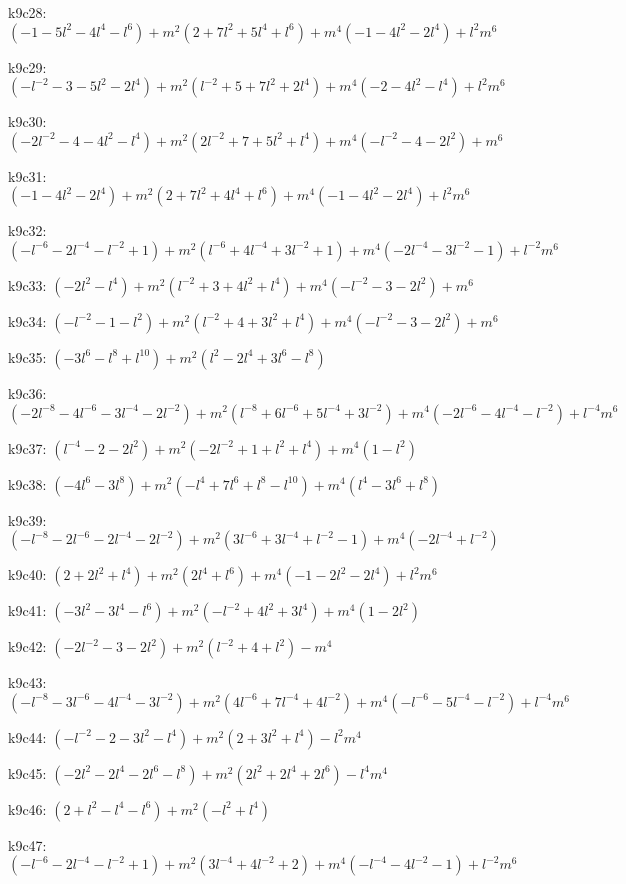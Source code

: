 k9c28: $ (-1-5l^{2}-4l^{4}-l^{6})  +m^{2}(2+7l^{2}+5l^{4}+l^{6})  +m^{4}(-1-4l^{2}-2l^{4})  +l^{2}m^{6} $ 

k9c29: $ (-l^{-2}-3-5l^{2}-2l^{4})  +m^{2}(l^{-2}+5+7l^{2}+2l^{4})  +m^{4}(-2-4l^{2}-l^{4})  +l^{2}m^{6} $ 

k9c30: $ (-2l^{-2}-4-4l^{2}-l^{4})  +m^{2}(2l^{-2}+7+5l^{2}+l^{4})  +m^{4}(-l^{-2}-4-2l^{2})  +m^{6} $ 

k9c31: $ (-1-4l^{2}-2l^{4})  +m^{2}(2+7l^{2}+4l^{4}+l^{6})  +m^{4}(-1-4l^{2}-2l^{4})  +l^{2}m^{6} $ 

k9c32: $ (-l^{-6}-2l^{-4}-l^{-2}+1)  +m^{2}(l^{-6}+4l^{-4}+3l^{-2}+1)  +m^{4}(-2l^{-4}-3l^{-2}-1)  +l^{-2}m^{6} $ 

k9c33: $ (-2l^{2}-l^{4})  +m^{2}(l^{-2}+3+4l^{2}+l^{4})  +m^{4}(-l^{-2}-3-2l^{2})  +m^{6} $ 

k9c34: $ (-l^{-2}-1-l^{2})  +m^{2}(l^{-2}+4+3l^{2}+l^{4})  +m^{4}(-l^{-2}-3-2l^{2})  +m^{6} $ 

k9c35: $ (-3l^{6}-l^{8}+l^{10})  +m^{2}(l^{2}-2l^{4}+3l^{6}-l^{8}) $ 

k9c36: $ (-2l^{-8}-4l^{-6}-3l^{-4}-2l^{-2})  +m^{2}(l^{-8}+6l^{-6}+5l^{-4}+3l^{-2})  +m^{4}(-2l^{-6}-4l^{-4}-l^{-2})  +l^{-4}m^{6} $ 

k9c37: $ (l^{-4}-2-2l^{2})  +m^{2}(-2l^{-2}+1+l^{2}+l^{4})  +m^{4}(1-l^{2}) $ 

k9c38: $ (-4l^{6}-3l^{8})  +m^{2}(-l^{4}+7l^{6}+l^{8}-l^{10})  +m^{4}(l^{4}-3l^{6}+l^{8}) $ 

k9c39: $ (-l^{-8}-2l^{-6}-2l^{-4}-2l^{-2})  +m^{2}(3l^{-6}+3l^{-4}+l^{-2}-1)  +m^{4}(-2l^{-4}+l^{-2}) $ 

k9c40: $ (2+2l^{2}+l^{4})  +m^{2}(2l^{4}+l^{6})  +m^{4}(-1-2l^{2}-2l^{4})  +l^{2}m^{6} $ 

k9c41: $ (-3l^{2}-3l^{4}-l^{6})  +m^{2}(-l^{-2}+4l^{2}+3l^{4})  +m^{4}(1-2l^{2}) $ 

k9c42: $ (-2l^{-2}-3-2l^{2})  +m^{2}(l^{-2}+4+l^{2})  -m^{4} $ 

k9c43: $ (-l^{-8}-3l^{-6}-4l^{-4}-3l^{-2})  +m^{2}(4l^{-6}+7l^{-4}+4l^{-2})  +m^{4}(-l^{-6}-5l^{-4}-l^{-2})  +l^{-4}m^{6} $ 

k9c44: $ (-l^{-2}-2-3l^{2}-l^{4})  +m^{2}(2+3l^{2}+l^{4})  -l^{2}m^{4} $ 

k9c45: $ (-2l^{2}-2l^{4}-2l^{6}-l^{8})  +m^{2}(2l^{2}+2l^{4}+2l^{6})  -l^{4}m^{4} $ 

k9c46: $ (2+l^{2}-l^{4}-l^{6})  +m^{2}(-l^{2}+l^{4}) $ 

k9c47: $ (-l^{-6}-2l^{-4}-l^{-2}+1)  +m^{2}(3l^{-4}+4l^{-2}+2)  +m^{4}(-l^{-4}-4l^{-2}-1)  +l^{-2}m^{6} $ 

